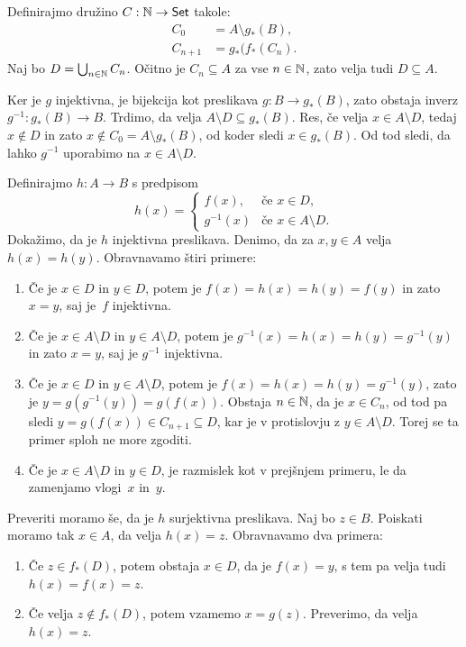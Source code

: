 \begin{dokaz}
  Definirajmo družino $C : \mathbb{N} \to \mathsf{Set}$ takole:
  \begin{align*}
    C_0 &= A \setminus g_{*}(B), \\
    C_{n+1} &= g_{*}(f_{*}(C_n).
  \end{align*}
  Naj bo $D = \bigcup_{n \in \mathbb{N}} C_n$. Očitno je $C_n \subseteq A$ za vse
  $n \in \mathbb{N}$, zato velja tudi $D \subseteq A$.

  Ker je $g$ injektivna, je bijekcija kot preslikava $g : B \to g_{*}(B)$, zato
  obstaja inverz $g^{-1} : g_{*}(B) \to B$. Trdimo, da velja
  $A \setminus D \subseteq g_{*}(B)$. Res, če velja $x \in A \setminus D$, tedaj
  $x \not\in D$ in zato $x \not\in C_0 = A \setminus g_{*}(B)$, od koder sledi
  $x \in g_{*}(B)$. Od tod sledi, da lahko $g^{-1}$ uporabimo na
  $x \in A \setminus D$.

  Definirajmo $h : A \to B$ s predpisom
  \begin{equation*}
    h(x) =
    \begin{cases}
      f(x), & \text{če $x \in D$,} \\
      g^{-1}(x) &\text{če $x \in A \setminus D$.}
    \end{cases}
  \end{equation*}
  Dokažimo, da je $h$ injektivna preslikava.
  Denimo, da za $x, y \in A$ velja $h(x) = h(y)$. Obravnavamo štiri primere:
  \begin{enumerate}
  \item Če je $x \in D$ in $y \in D$, potem je $f(x) = h(x) = h(y) = f(y)$ in
    zato $x = y$, saj je~$f$ injektivna.
  \item Če je $x \in A \setminus D$ in $y \in A \setminus D$, potem je
    $g^{-1}(x) = h(x) = h(y) = g^{-1}(y)$ in zato $x = y$, saj je $g^{-1}$
    injektivna.
  \item Če je $x \in D$ in $y \in A \setminus D$, potem je
    $f(x) = h(x) = h(y) = g^{-1}(y)$, zato je $y = g(g^{-1}(y)) = g(f(x))$.
    Obstaja $n \in \mathbb{N}$, da je $x \in C_n$, od tod pa sledi
    $y = g(f(x)) \in C_{n+1} \subseteq D$, kar je v protislovju z
    $y \in A \setminus D$. Torej se ta primer sploh ne more zgoditi.
  \item Če je $x \in A \setminus D$ in $y \in D$, je razmislek kot v prejšnjem
    primeru, le da zamenjamo vlogi~$x$ in~$y$.
  \end{enumerate}

  Preveriti moramo še, da je $h$ surjektivna preslikava. Naj bo $z \in B$.
  Poiskati moramo tak $x \in A$, da velja $h(x) = z$. Obravnavamo dva primera:
  \begin{enumerate}
  \item Če $z \in f_{*}(D)$, potem obstaja $x \in D$, da je $f(x) = y$, s tem pa
    velja tudi $h(x) = f(x) = z$.
  \item Če velja $z \not\in f_{*}(D)$, potem vzamemo $x = g(z)$. Preverimo, da
    velja $h(x) = z$.


\end{enumerate}
\end{dokaz}
